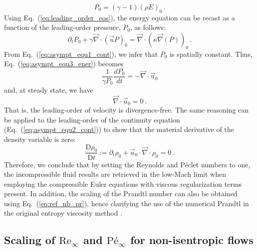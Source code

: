 \documentclass[preprint,10pt]{elsarticle}
\renewcommand{\div}{\vec{\nabla}\! \cdot \!}
\newcommand{\grad}{\vec{\nabla}}
\renewcommand{\Re}{\textrm{Re}}
\newcommand{\Pe}{\textrm{P\'e}}
\newcommand{\matder}[1]{\frac{\textrm{D} #1}{\textrm{D} t}}
\newcommand{\eqt}[1]{Eq.~(\ref{#1})}                     %
\begin{document}
\begin{equation}
\label{eq:leading_order_eos}
 P_0 = (\gamma - 1) (\rho E)_0 \,.
\end{equation}
%
Using \eqt{eq:leading_order_eos}, the energy equation can be recast as a function of the leading-order pressure, $P_0$, as follows:
%
\begin{equation}\label{eq:asympt_equ3_ener}
 \partial_t P_0 + \gamma \div \left( \vec{u} P \right)_0 =  \div(\kappa \grad(P))_0 \,.
\end{equation}
%
From \eqt{eq:asympt_equ1_cont}, we infer that $P_0$ is spatially constant. Thus, \eqt{eq:asympt_equ3_ener} becomes
%
\begin{equation}
\frac{1}{\gamma P_0} \frac{d P_0}{dt} = - \div \vec{u}_0 
\end{equation}
%
and, at steady state, we have
%
\begin{equation}
 \div  \vec{u}_0 = 0 \, .
\end{equation}
%
That is, the leading-order of velocity is divergence-free. The same reasoning can be applied to the leading-order 
of the continuity equation (\eqt{eq:asympt_equ2_cont}) to show that the material derivative of the density variable is zero:
\begin{equation}
\matder{\rho_0} := \partial_t \rho_0 + \vec{u}_0 \cdot \div \rho_0 = 0 \, .
\end{equation}
%
Therefore, we conclude that by setting the Reynolds and P\'eclet numbers to one, the incompressible fluid 
results are retrieved in the low-Mach limit when employing the compressible Euler equations with viscous 
regularization terms present. In addition, the scaling of the Prandtl number can also be obtained 
using \eqt{eq:ref_nb_pr}, hence clarifying the use of the numerical Prandtl in the original entropy viscosity method \cite{jlg1}.

\subsection{Scaling of $\Re_\infty$ and $\Pe_\infty$ for non-isentropic flows} \label{sec:nonisentropic}
\end{document}
